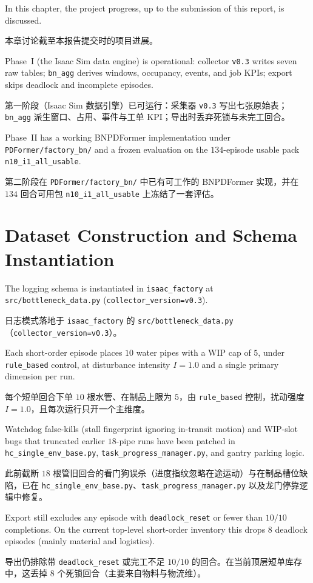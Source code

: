 \documentclass[12pt,a4paper,oneside,scheme=plain]{ctexrep}
\newcommand{\bip}[2]{%
  \par #1\par
  \nobreak\vspace{0.12em}%
  {\small\color{black!62}#2}\par
  \vspace{0.62em}%
}
\begin{document}
\bip
{In this chapter, the project progress, up to the submission of this report, is discussed.}
{本章讨论截至本报告提交时的项目进展。}

\bip
{Phase~I (the Isaac Sim data engine) is operational: collector \texttt{v0.3} writes seven raw tables; \texttt{bn\_agg} derives windows, occupancy, events, and job KPIs; export skips deadlock and incomplete episodes.}
{第一阶段（Isaac Sim 数据引擎）已可运行：采集器 \texttt{v0.3} 写出七张原始表；\texttt{bn\_agg} 派生窗口、占用、事件与工单 KPI；导出时丢弃死锁与未完工回合。}

\bip
{Phase~II has a working BNPDFormer implementation under \texttt{PDFormer/factory\_bn/} and a frozen evaluation on the $134$-episode usable pack \texttt{n10\_i1\_all\_usable}.}
{第二阶段在 \texttt{PDFormer/factory\_bn/} 中已有可工作的 BNPDFormer 实现，并在 $134$ 回合可用包 \texttt{n10\_i1\_all\_usable} 上冻结了一套评估。}

\section[Dataset Construction and Schema Instantiation / 数据集构建与模式落地]{Dataset Construction and Schema Instantiation}
\label{sec:prog-data}

\bip
{The logging schema is instantiated in \texttt{isaac\_factory} at \texttt{src/bottleneck\_data.py} (\texttt{collector\_version=v0.3}).}
{日志模式落地于 \texttt{isaac\_factory} 的 \texttt{src/bottleneck\_data.py}（\texttt{collector\_version=v0.3}）。}

\bip
{Each short-order episode places $10$ water pipes with a WIP cap of $5$, under \texttt{rule\_based} control, at disturbance intensity $I=1.0$ and a single primary dimension per run.}
{每个短单回合下单 $10$ 根水管、在制品上限为 $5$，由 \texttt{rule\_based} 控制，扰动强度 $I=1.0$，且每次运行只开一个主维度。}

\bip
{Watchdog false-kills (stall fingerprint ignoring in-transit motion) and WIP-slot bugs that truncated earlier $18$-pipe runs have been patched in \texttt{hc\_single\_env\_base.py}, \texttt{task\_progress\_manager.py}, and gantry parking logic.}
{此前截断 $18$ 根管旧回合的看门狗误杀（进度指纹忽略在途运动）与在制品槽位缺陷，已在 \texttt{hc\_single\_env\_base.py}、\texttt{task\_progress\_manager.py} 以及龙门停靠逻辑中修复。}

\bip
{Export still excludes any episode with \texttt{deadlock\_reset} or fewer than $10/10$ completions. On the current top-level short-order inventory this drops $8$ deadlock episodes (mainly material and logistics).}
{导出仍排除带 \texttt{deadlock\_reset} 或完工不足 $10/10$ 的回合。在当前顶层短单库存中，这丢掉 $8$ 个死锁回合（主要来自物料与物流维）。}
\end{document}
